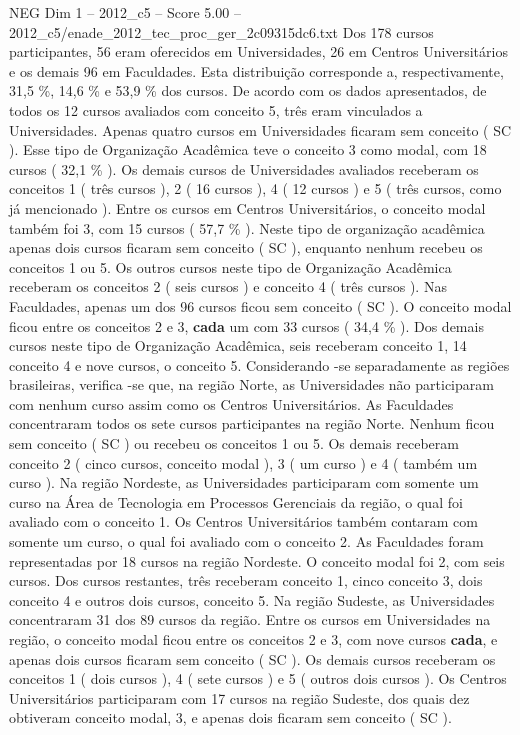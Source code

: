 \begin{textsample}{NEG Dim 1 – 2012\_c5 – Score 5.00 – 2012\_c5/enade\_2012\_tec\_proc\_ger\_2c09315dc6.txt}
Dos 178 cursos participantes, 56 eram oferecidos em Universidades, 26 em Centros Universitários e os demais 96 em Faculdades.
Esta distribuição corresponde a, respectivamente, 31,5 \%, 14,6 \% e 53,9 \% dos cursos.
De acordo com os dados apresentados, de todos os 12 cursos avaliados com conceito 5, três eram vinculados a Universidades.
Apenas quatro cursos em Universidades ficaram sem conceito ( SC ).
Esse tipo de Organização Acadêmica teve o conceito 3 como modal, com 18 cursos ( 32,1 \% ).
Os demais cursos de Universidades avaliados receberam os conceitos 1 ( três cursos ), 2 ( 16 cursos ), 4 ( 12 cursos ) e 5 ( três cursos, como já mencionado ).
Entre os cursos em Centros Universitários, o conceito modal também foi 3, com 15 cursos ( 57,7 \% ).
Neste tipo de organização acadêmica apenas dois cursos ficaram sem conceito ( SC ), enquanto nenhum recebeu os conceitos 1 ou 5.
Os outros cursos neste tipo de Organização Acadêmica receberam os conceitos 2 ( seis cursos ) e conceito 4 ( três cursos ).
Nas Faculdades, apenas um dos 96 cursos ficou sem conceito ( SC ).
O conceito modal ficou entre os conceitos 2 e 3, \textbf{cada} um com 33 cursos ( 34,4 \% ).
Dos demais cursos neste tipo de Organização Acadêmica, seis receberam conceito 1, 14 conceito 4 e nove cursos, o conceito 5.
Considerando -se separadamente as regiões brasileiras, verifica -se que, na região Norte, as Universidades não participaram com nenhum curso assim como os Centros Universitários.
As Faculdades concentraram todos os sete cursos participantes na região Norte.
Nenhum ficou sem conceito ( SC ) ou recebeu os conceitos 1 ou 5.
Os demais receberam conceito 2 ( cinco cursos, conceito modal ), 3 ( um curso ) e 4 ( também um curso ).
Na região Nordeste, as Universidades participaram com somente um curso na Área de Tecnologia em Processos Gerenciais da região, o qual foi avaliado com o conceito 1.
Os Centros Universitários também contaram com somente um curso, o qual foi avaliado com o conceito 2.
As Faculdades foram representadas por 18 cursos na região Nordeste.
O conceito modal foi 2, com seis cursos.
Dos cursos restantes, três receberam conceito 1, cinco conceito 3, dois conceito 4 e outros dois cursos, conceito 5.
Na região Sudeste, as Universidades concentraram 31 dos 89 cursos da região.
Entre os cursos em Universidades na região, o conceito modal ficou entre os conceitos 2 e 3, com nove cursos \textbf{cada}, e apenas dois cursos ficaram sem conceito ( SC ).
Os demais cursos receberam os conceitos 1 ( dois cursos ), 4 ( sete cursos ) e 5 ( outros dois cursos ).
Os Centros Universitários participaram com 17 cursos na região Sudeste, dos quais dez obtiveram conceito modal, 3, e apenas dois ficaram sem conceito ( SC ).

\end{textsample}

